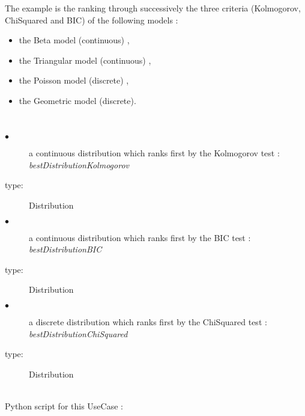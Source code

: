 The example is the ranking through successively the three criteria (Kolmogorov, ChiSquared and BIC) of the following models :
\begin{itemize}
\item the Beta model (continuous) ,
\item the Triangular model (continuous) ,
\item the Poisson model (discrete) ,
\item the Geometric model (discrete).
\end{itemize}

\textspace\\

{
  \begin{description}
  \item[$\bullet$] a continuous distribution which ranks first by the Kolmogorov test  : {\itshape bestDistributionKolmogorov}
  \item[type:] Distribution
  \item[$\bullet$] a continuous distribution which ranks first by the BIC test  : {\itshape bestDistributionBIC}
  \item[type:] Distribution
  \item[$\bullet$] a discrete distribution which ranks first by the ChiSquared test  : {\itshape bestDistributionChiSquared}
  \item[type:] Distribution
  \end{description}
}

\textspace\\
Python script for this UseCase :

